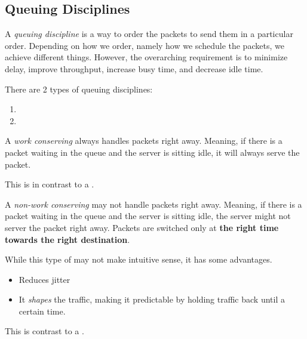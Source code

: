 \subsection{Queuing Disciplines}\label{subsec:Queuing_Disciplines}
\begin{definition}\label{def:Queuing_Discipline}
  A \emph{queuing discipline} is a way to order the packets to send them in a particular order.
  Depending on how we order, namely how we schedule the packets, we achieve different things.
  However, the overarching requirement is to minimize delay, improve throughput, increase busy time, and decrease idle time.

  There are 2 types of queuing disciplines:
  \begin{enumerate}[noitemsep]
  \item {}
  \item {}
  \end{enumerate}
\end{definition}

\begin{definition}\label{def:Work_Conserving}
  A \emph{work conserving}  always handles packets right away.
  Meaning, if there is a packet waiting in the queue and the server is sitting idle, it will always serve the packet.

  This is in contrast to a  .
\end{definition}

\begin{definition}\label{def:Non_Work_Conserving}
  A \emph{non-work conserving}  may not handle packets right away.
  Meaning, if there is a packet waiting in the queue and the server is sitting idle, the server might not server the packet right away.
  Packets are switched only at \textbf{the right time towards the right destination}.

  While this type of  may not make intuitive sense, it has some advantages.
  \begin{itemize}[noitemsep]
  \item Reduces jitter
  \item It \emph{shapes} the traffic, making it predictable by holding traffic back until a certain time.
  \end{itemize}

  This is contrast to a  .
\end{definition}

